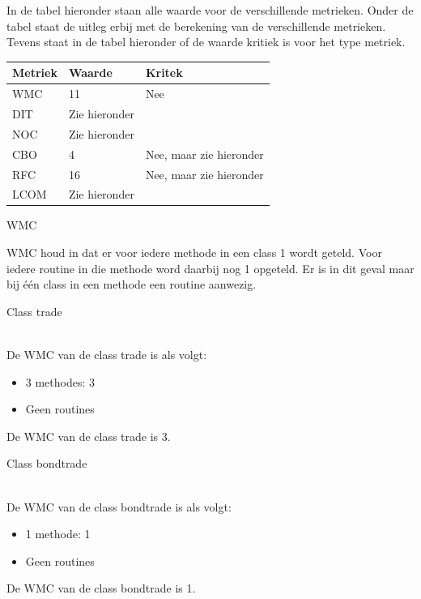 \documentclass[a4paper,titlepage]{artikel1}
\begin{document}
   In de tabel hieronder staan alle waarde voor de verschillende metrieken. Onder de tabel staat de uitleg erbij met de berekening van de verschillende metrieken. Tevens staat in de tabel hieronder of de waarde kritiek is voor het type metriek.
   \begin{center}
     \begin{tabular}{|l||l|l|}
       \hline
       Metriek & Waarde & Kritek \\
       \hline
       WMC & 11 & Nee \\
       \hline
       DIT & Zie hieronder & \\
       \hline
       NOC & Zie hieronder & \\
       \hline
       CBO & 4 & Nee, maar zie hieronder\\
       \hline
       RFC & 16 & Nee, maar zie hieronder \\
       \hline
       LCOM & Zie hieronder & \\
       \hline
      \end{tabular}
   \end{center}
   \begin{center}\begin{bf}WMC\end{bf}\end{center}
   WMC houd in dat er voor iedere methode in een class 1 wordt geteld. Voor iedere routine in die methode word daarbij nog 1 opgeteld. Er is in dit geval maar bij één class in een methode een routine aanwezig.
   \begin{bf}Class trade\end{bf}\\
     De WMC van de class trade is als volgt:
     \begin{itemize}
       \item 3 methodes: 3
       \item Geen routines
     \end{itemize}
     De WMC van de class trade is 3.\\
   \begin{bf}Class bondtrade\end{bf}\\
     De WMC van de class bondtrade is als volgt:
     \begin{itemize}
       \item 1 methode: 1
       \item Geen routines
     \end{itemize}
     De WMC van de class bondtrade is 1.\\
\end{document}
